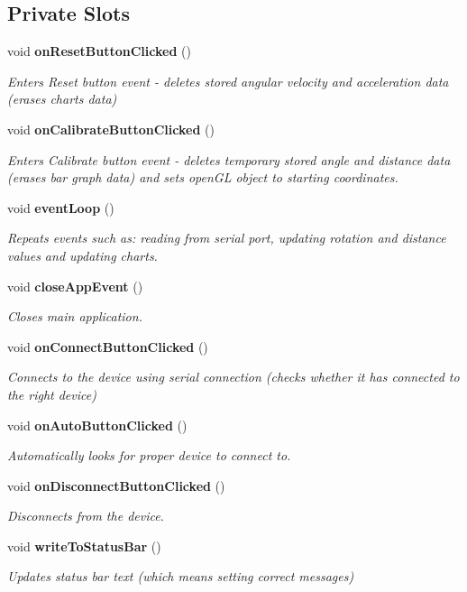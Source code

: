 \subsection*{Private Slots}
\begin{DoxyCompactItemize}
\item 
void \textbf{ on\+Reset\+Button\+Clicked} ()
\begin{DoxyCompactList}\small\item\em Enters Reset button event -\/ deletes stored angular velocity and acceleration data (erases charts data) \end{DoxyCompactList}\item 
void \textbf{ on\+Calibrate\+Button\+Clicked} ()
\begin{DoxyCompactList}\small\item\em Enters Calibrate button event -\/ deletes temporary stored angle and distance data (erases bar graph data) and sets open\+GL object to starting coordinates. \end{DoxyCompactList}\item 
void \textbf{ event\+Loop} ()
\begin{DoxyCompactList}\small\item\em Repeats events such as\+: reading from serial port, updating rotation and distance values and updating charts. \end{DoxyCompactList}\item 
void \textbf{ close\+App\+Event} ()
\begin{DoxyCompactList}\small\item\em Closes main application. \end{DoxyCompactList}\item 
void \textbf{ on\+Connect\+Button\+Clicked} ()
\begin{DoxyCompactList}\small\item\em Connects to the device using serial connection (checks whether it has connected to the right device) \end{DoxyCompactList}\item 
void \textbf{ on\+Auto\+Button\+Clicked} ()
\begin{DoxyCompactList}\small\item\em Automatically looks for proper device to connect to. \end{DoxyCompactList}\item 
void \textbf{ on\+Disconnect\+Button\+Clicked} ()
\begin{DoxyCompactList}\small\item\em Disconnects from the device. \end{DoxyCompactList}\item 
void \textbf{ write\+To\+Status\+Bar} ()
\begin{DoxyCompactList}\small\item\em Updates status bar text (which means setting correct messages) \end{DoxyCompactList}\end{DoxyCompactItemize}
